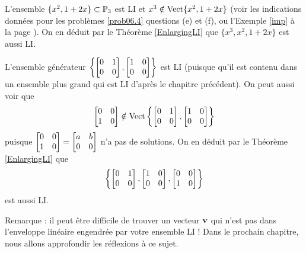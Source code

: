 \begin{myexample} L'ensemble $\{ x^2, 1+2x\} \subset \PP_3$ est LI et $x^3 \notin \sp{ x^2, 1+2x}$ (voir les indications données pour les problèmes \ref{prob06.4} questions (e) et (f), ou l'Exemple \ref{imp} à la page \pageref{imp}). 
On en déduit par le Théorème \ref{EnlargingLI} que  $\{ x^3, x^2, 1+2x \}$ est aussi LI. \end{myexample}

\begin{myexample} L'ensemble générateur $\left\{ \mat{0 & 1 \\ 0 & 0}, \mat{1 & 0 \\ 0 & 0} \right\}$ est LI (puisque qu'il est contenu dans un ensemble plus grand qui est LI d'après le chapitre pr\'ec\'edent). On peut aussi voir que 
$$
\mat{0 & 0 \\ 1 & 0} \notin \spn\left\{ \mat{0 & 1 \\ 0 & 0}, \mat{1 & 0 \\ 0 & 0} \right\}
$$
puisque $\mat{0 & 0 \\ 1 & 0} = \mat{a & b\\0 & 0}$ n'a pas de solutions.
On en déduit par le Théorème \ref{EnlargingLI} que
$$
\left\{ \mat{0 & 1 \\ 0 & 0}, \mat{1 & 0 \\ 0 & 0}, \mat{0 & 0 \\ 1 & 0} \right\}
$$
est aussi LI. \end{myexample}

Remarque : il peut être difficile de trouver un vecteur $\vv$ qui n'est pas dans l'enveloppe lin\'eaire engendr\'ee par votre ensemble LI !  Dans le prochain chapitre, nous allons approfondir les r\'eflexions à ce sujet.

\newpage



